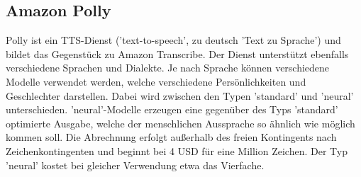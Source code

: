 \subsection{Amazon Polly}
Polly ist ein TTS-Dienst ('text-to-speech', zu deutsch 'Text zu Sprache') und bildet das Gegenstück zu Amazon Transcribe. Der Dienst unterstützt ebenfalls verschiedene Sprachen und Dialekte. Je nach Sprache können verschiedene Modelle verwendet werden, welche verschiedene Persönlichkeiten und Geschlechter darstellen. Dabei wird zwischen den Typen 'standard' und 'neural' unterschieden. 'neural'-Modelle erzeugen eine gegenüber des Typs 'standard' optimierte Ausgabe, welche der menschlichen Aussprache so ähnlich wie möglich kommen soll. Die Abrechnung erfolgt außerhalb des freien Kontingents nach Zeichenkontingenten und beginnt bei 4 USD für eine Million Zeichen. Der Typ 'neural' kostet bei gleicher Verwendung etwa das Vierfache. 
